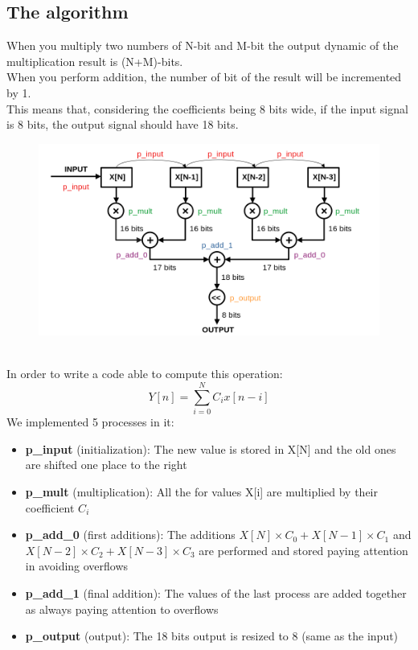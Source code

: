 \documentclass[11pt,a4paper,twocolumn]{IEEEtran}
\begin{document}
	\subsection*{The algorithm}
	When you multiply two numbers of N-bit and M-bit the output dynamic of the multiplication result is (N+M)-bits.\\
	When you perform addition, the number of bit of the result will be incremented by 1.\\
	This means that, considering the coefficients being 8 bits wide, if the input signal is 8 bits, the output signal should have 18 bits.\\
	\begin{figure}[h]
		\hspace*{-1cm}
		\includegraphics[width=1.2\linewidth]{img/firalg1}
	\end{figure}\\
	In order to write a code able to compute this operation:
	$$ Y[n] = \sum_{i=0}^N C_i x[n-i] $$
	We implemented 5 processes in it:
	\begin{itemize}
	\item\textbf{p\_input} (initialization): The new value is stored in X[N] and the old ones are shifted one place to the right
	\item\textbf{p\_mult} (multiplication): All the for values X[i] are multiplied by their coefficient $C_i$
	\item\textbf{p\_add\_0} (first additions): The additions $X[N]\times C_0 + X[N-1]\times C_1$ and $X[N-2]\times C_2 + X[N-3]\times C_3$ are performed and stored paying attention in avoiding overflows
	\item\textbf{p\_add\_1} (final addition): The values of the last process are added together as always paying attention to overflows
	\item\textbf{p\_output} (output): The 18 bits output is resized to 8 (same as the input)
	\end{itemize}
\end{document}
